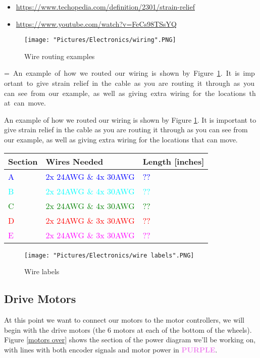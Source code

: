 \documentclass[12pt]{article}
\makeatletter
\newcommand{\mybox}[1]{%
  \setbox0=\hbox{#1}%
  \setlength{\@tempdima}{\dimexpr\wd0+13pt}%
  \begin{tcolorbox}[colframe=mycolor,boxrule=0.5pt,arc=4pt,
      left=6pt,right=6pt,top=6pt,bottom=6pt,boxsep=0pt,width=0.95\textwidth]
    #1
  \end{tcolorbox}
}
\makeatother
\begin{document}
\begin{itemize}
	\item \href{https://www.techopedia.com/definition/2301/strain-relief}{https://www.techopedia.com/definition/2301/strain-relief}
	\item \href{https://www.youtube.com/watch?v=FeCs98TSsYQ}{https://www.youtube.com/watch?v=FeCs98TSsYQ}
\end{itemize}


\begin{figure}[H]
 	\centering
	\texttt{[image: "Pictures/Electronics/wiring".PNG]}
 	\caption{Wire routing examples}
	\label{wiring}
\end{figure}

\mybox{
An example of how we routed our wiring is shown by Figure \ref{wiring}. It is important to give strain relief in the cable as you are routing it through as you can see from our example, as well as giving extra wiring for the locations that can move. 
}

\begin{tabular}[3] {| p{2cm} | p{7cm} | p{4cm} |}
	\hline
	\textbf{Section} & \textbf{Wires Needed} & \textbf{Length [inches]}  \\ \hline
	\textcolor{blue}{A} & \textcolor{blue}{2x 24AWG \& 4x 30AWG} & \textcolor{blue}{??} \\ \hline
	\textcolor{cyan}{B} & \textcolor{cyan}{2x 24AWG \& 4x 30AWG} & \textcolor{cyan}{??} \\ \hline
	\textcolor{green}{C} & \textcolor{green}{2x 24AWG \& 4x 30AWG} & \textcolor{green}{??} \\ \hline
	\textcolor{red}{D} & \textcolor{red}{2x 24AWG \& 3x 30AWG} & \textcolor{red}{??} \\ \hline
	\textcolor{magenta}{E} & \textcolor{magenta}{2x 24AWG \& 3x 30AWG} & \textcolor{magenta}{??} \\ \hline
\end{tabular}

\begin{figure}[H]
 	\centering
	\texttt{[image: "Pictures/Electronics/wire labels".PNG]}
 	\caption{Wire labels}
	\label{wire lengths}
\end{figure}

\subsection{Drive Motors}
At this point we want to connect our motors to the motor controllers, we will begin with the drive motors (the 6 motors at each of the bottom of the wheels). Figure \ref{motors over} shows the section of the power diagram we'll be working on, with lines with both encoder signals and motor power in \textcolor{violet}{\textbf{PURPLE}}.
\end{document}
